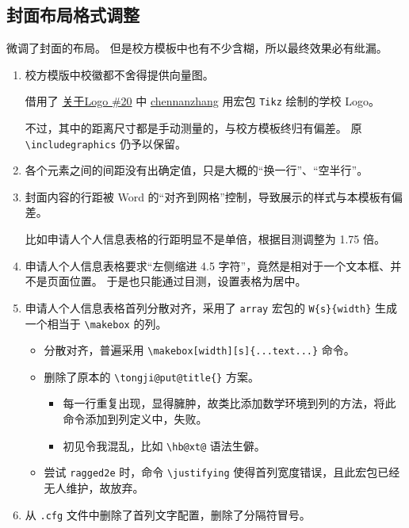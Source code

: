 \documentclass[../Main/thesis.tex]{subfiles}
\begin{document}
\subsection{封面布局格式调整}

微调了封面的布局。 但是校方模板中也有不少含糊，所以最终效果必有纰漏。

\begin{enumerate}
\def\labelenumi{\arabic{enumi}.}
\item
  校方模版中校徽都不舍得提供向量图。

  借用了
  \href{https://github.com/marquistj13/TongjiThesis/issues/20}{关于Logo
  \#20} 中 \href{https://github.com/chennanzhang}{chennanzhang} 用宏包
  \texttt{Tikz} 绘制的学校 Logo。

  不过，其中的距离尺寸都是手动测量的，与校方模板终归有偏差。 原
  \texttt{\textbackslash{}includegraphics} 仍予以保留。
\item
  各个元素之间的间距没有出确定值，只是大概的``换一行''、``空半行''。
\item
  封面内容的行距被 Word
  的``对齐到网格''控制，导致展示的样式与本模板有偏差。

  比如申请人个人信息表格的行距明显不是单倍，根据目测调整为 1.75 倍。
\item
  申请人个人信息表格要求``左侧缩进 4.5
  字符''，竟然是相对于一个文本框、并不是页面位置。
  于是也只能通过目测，设置表格为居中。
\item
  申请人个人信息表格首列分散对齐，采用了 \texttt{array} 宏包的
  \texttt{W\{s\}\{width\}} 生成一个相当于
  \texttt{\textbackslash{}makebox} 的列。

  \begin{itemize}
  \item
    分散对齐，普遍采用
    \texttt{\textbackslash{}makebox{[}width{]}{[}s{]}\{...text...\}}
    命令。
  \item
    删除了原本的 \texttt{\textbackslash{}tongji@put@title\{\}} 方案。

    \begin{itemize}
    \item
      每一行重复出现，显得臃肿，故类比添加数学环境到列的方法，将此命令添加到列定义中，失败。
    \item
      初见令我混乱，比如 \texttt{\textbackslash{}hb@xt@} 语法生僻。
    \end{itemize}
  \item
    尝试 \texttt{ragged2e} 时，命令 \texttt{\textbackslash{}justifying}
    使得首列宽度错误，且此宏包已经无人维护，故放弃。
  \end{itemize}
\item
  从 \texttt{.cfg} 文件中删除了首列文字配置，删除了分隔符冒号。


\end{enumerate}
\end{document}
